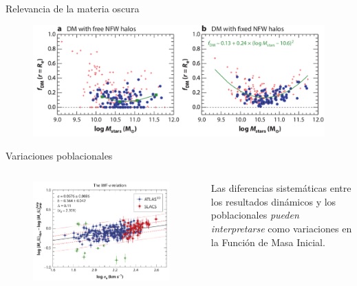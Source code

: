 \documentclass[xcolor=dvipsnames,4pt]{beamer}
\newenvironment{changemargin}[2]{%
  \begin{list}{}{%
    \setlength{\topsep}{0pt}%
    \setlength{\leftmargin}{#1}%
    \setlength{\rightmargin}{#2}%
    \setlength{\listparindent}{\parindent}%
    \setlength{\itemindent}{\parindent}%
    \setlength{\parsep}{\parskip}%
  }%
\item[]}{\end{list}}
\begin{document}
\begin{frame}{Relevancia de la materia oscura}
\begin{changemargin}{-1cm}{-1cm}
\begin{figure}
\includegraphics[scale=0.75]{img/mo_var.png}
\end{figure}
\end{changemargin}
\end{frame}

\begin{frame}{Variaciones poblacionales}
\begin{changemargin}{-1cm}{-1cm}
\begin{columns}
\begin{figure}
\includegraphics[scale=0.65]{img/imf_var.png}
\end{figure}
\small
Las diferencias sistemáticas entre los resultados dinámicos y los poblacionales \emph{pueden interpretarse} como variaciones en la Función de Masa Inicial.
\end{columns}
\end{changemargin}
\end{frame}
\end{document}
